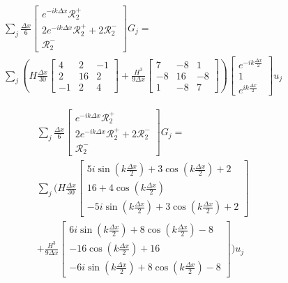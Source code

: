 \documentclass[12pt]{article}
\begin{document}
\begin{multline}
\sum_j \frac{\Delta x}{6}\begin{bmatrix} e^{-ik\Delta x} \mathcal{R}^+_2 \\2 e^{-ik\Delta x} \mathcal{R}^+_2 +2 \mathcal{R}^-_2 \\ \mathcal{R}^-_2 \end{bmatrix} G_j = \\\sum_j \left(H\frac{\Delta x}{30}\begin{bmatrix} 4 &2 &-1 \\2 &16 &2  \\-1 &2 &4 \end{bmatrix} + \frac{H^3 }{9\Delta x}\begin{bmatrix} 7 &-8 &1  \\-8 &16 &-8  \\1 &-8 &7  \end{bmatrix} \right) \begin{bmatrix} e^{-ik\frac{\Delta x}{2}} \\1 \\ e^{ik\frac{\Delta x}{2}} \end{bmatrix} u_j
\end{multline}

\begin{multline}
\sum_j \frac{\Delta x}{6}\begin{bmatrix} e^{-ik\Delta x} \mathcal{R}^+_2 \\2 e^{-ik\Delta x} \mathcal{R}^+_2 +2 \mathcal{R}^-_2 \\ \mathcal{R}^-_2 \end{bmatrix} G_j = \\\sum_j \Bigg(H\frac{\Delta x}{30}\begin{bmatrix} 5i\sin\left(k \frac{\Delta x}{2}\right) + 3\cos\left(k \frac{\Delta x}{2}\right) + 2\\16 + 4 \cos\left(k \frac{\Delta x}{2}\right) \\ -5i\sin\left(k \frac{\Delta x}{2}\right) + 3\cos\left(k \frac{\Delta x}{2}\right) + 2 \end{bmatrix} \\+ \frac{H^3 }{9\Delta x}\begin{bmatrix} 6i\sin\left(k \frac{\Delta x}{2}\right) + 8\cos\left(k \frac{\Delta x}{2}\right) - 8 \\ - 16\cos\left(k \frac{\Delta x}{2}\right) + 16 \\ -6i\sin\left(k \frac{\Delta x}{2}\right) + 8\cos\left(k \frac{\Delta x}{2}\right) - 8 \end{bmatrix}  \Bigg) u_j
\end{multline}
\end{document}
